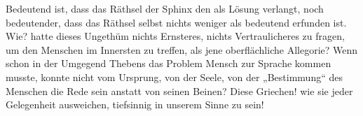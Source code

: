 Bedeutend ist, dass das Räthsel der Sphinx den  als Lösung verlangt, noch bedeutender, dass das Räthsel selbst nichts weniger als bedeutend erfunden ist. Wie? hatte dieses  Ungethüm nichts Ernsteres, nichts Vertraulicheres zu fragen, um den Menschen im Innersten zu treffen, als jene oberflächliche Allegorie? Wenn schon in der Umgegend Thebens das Problem Mensch zur Sprache kommen musste, konnte nicht vom Ursprung, von der Seele, von der „Bestimmung“ des Menschen die Rede sein anstatt von seinen Beinen? Diese Griechen! wie sie jeder Gelegenheit ausweichen, tiefsinnig in unserem Sinne zu sein!
\par

